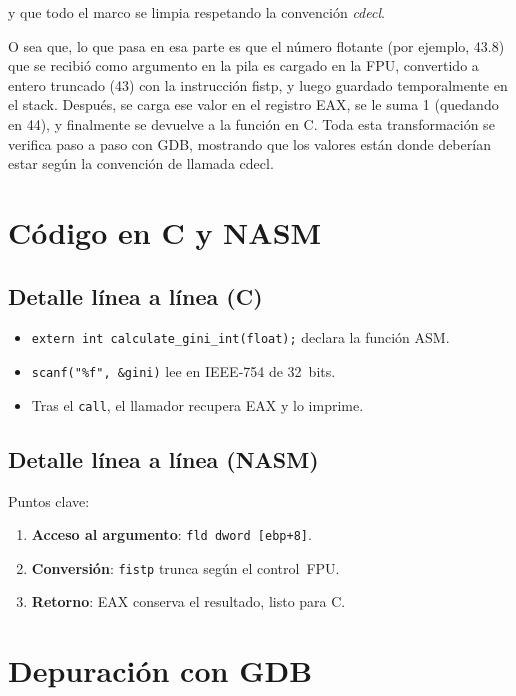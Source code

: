 \documentclass[a4paper,12pt]{article}
\begin{document}
y que todo el marco se limpia respetando la convención \emph{cdecl}.

O sea que, lo que pasa en esa parte es que el número flotante (por ejemplo, 43.8) que se recibió como argumento en la pila es cargado en la FPU, convertido a entero truncado (43) con la instrucción fistp, y luego guardado temporalmente en el stack. Después, se carga ese valor en el registro EAX, se le suma 1 (quedando en 44), y finalmente se devuelve a la función en C. Toda esta transformación se verifica paso a paso con GDB, mostrando que los valores están donde deberían estar según la convención de llamada cdecl.
\newpage
\section{Código en C y NASM}
\subsection{Detalle línea a línea (C)}
\begin{itemize}[leftmargin=*]
  \item \lstinline|extern int calculate_gini_int(float);| declara la función ASM.
  \item \lstinline|scanf("%f", &gini)| lee en IEEE‑754 de 32 bits.
  \item Tras el \texttt{call}, el llamador recupera EAX y lo imprime.
\end{itemize}

\subsection{Detalle línea a línea (NASM)}


Puntos clave:
\begin{enumerate}[label=\arabic*.]
  \item \textbf{Acceso al argumento}: \lstinline|fld dword [ebp+8]|.
  \item \textbf{Conversión}: \lstinline|fistp| trunca según el control FPU.
  \item \textbf{Retorno}: EAX conserva el resultado, listo para C.
\end{enumerate}

\section{Depuración con GDB}
\end{document}
